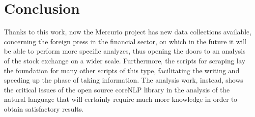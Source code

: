 \section{Conclusion}
Thanks to this work, now the Mercurio project has new data collections available, concerning the foreign press in the financial sector, on which in the future it will be able to perform more specific analyzes, thus opening the doors to an analysis of the stock exchange on a wider scale. Furthermore, the scripts for scraping lay the foundation for many other scripts of this type, facilitating the writing and speeding up the phase of taking information. The analysis work, instead, shows the critical issues of the open source coreNLP library in the analysis of the natural language that will certainly require much more knowledge in order to obtain satisfactory results.